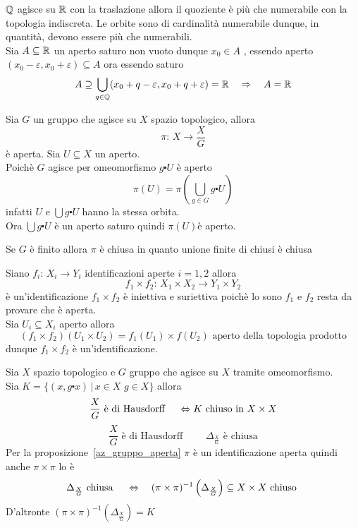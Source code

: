 \spazio
\begin{ese}$\mathbb{Q}$ agisce su $\mathbb{R}$ con la traslazione allora il quoziente \`e pi\`u che numerabile con la topologia indiscreta.
\proof
Le orbite sono di cardinalit\`a numerabile dunque, in quantit\`a, devono essere pi\`u che numerabili.\\
Sia $A\subseteq \mathbb{R}$ un aperto saturo non vuoto dunque $x_0 \in A $ , essendo aperto $(x_0-\varepsilon, x_0 + \varepsilon ) \subseteq A $ ora essendo saturo
$$ A \supseteq \bigcup_{q \in \mathbb{Q}} (x_0+q-\varepsilon, x_0+q +\varepsilon) =\mathbb{R} \quad \Rightarrow \quad A = \mathbb{R}$$
\end{ese}
\spazio
\begin{prop}\label{az_gruppo_aperta}Sia $G$ un gruppo che agisce su $X$ spazio topologico, allora
$$ \pi:\, X \to \frac{X}{G}$$
\`e aperta.
\proof Sia $U \subseteq X$ un aperto.\\
Poich\`e $G$ agisce per omeomorfismo $g\centerdot U $ \`e aperto 
$$ \pi(U) = \pi \left( \bigcup_{g \in G } g\centerdot U \right)$$
infatti $U$ e $\bigcup g \centerdot U$ hanno la stessa orbita.\\
Ora $\bigcup g\centerdot U$ \`e un aperto saturo quindi $\pi(U)$\`e aperto.
\endproof
\end{prop}
\begin{oss}Se $G$ \`e finito allora $\pi$ \`e chiusa in quanto unione finite di chiusi \`e chiusa
\end{oss}
\spazio
\begin{prop}Siano $f_i :\, X_i \to Y_i$ identificazioni aperte $i=1,2$ allora
$$ f_1 \times f_2 :\, X_1 \times X_2 \to Y_1 \times Y_2$$ \`e un'identificazione
\proof $f_1\times f_2$ \`e iniettiva e suriettiva poich\`e lo sono $f_1$ e $f_2$ resta da provare che \`e aperta.\\
Sia $U_i\subseteq X_i$ aperto allora
$$ ( f_1 \times f_2) (U_1 \times U_2 ) = f_1(U_1) \times f(U_2) \text{ aperto della topologia prodotto}$$
dunque $f_1\times f_2$ \`e un'identificazione.
\end{prop}
\spazio
\begin{prop}Sia $X$ spazio topologico e $G$ gruppo che agisce su $X$ tramite omeomorfismo.\\
Sia $K = \{ (x,g\centerdot x) \, \vert \,  x\in X \, \, g \in X \}$ allora
$$ \frac{X}{G} \text{ \`e di Hausdorff } \quad \Leftrightarrow  K \text{ chiuso in } X \times X $$
\proof $$ \frac{X}{G} \text{ \`e di Hausdorff } \quad  \quad \Delta_{\frac{X}{G}} \text{ \`e chiusa}$$
Per la proposizione~\ref{az_gruppo_aperta} $\pi$ \`e un identificazione aperta quindi anche $\pi \times \pi$ lo \`e
$$ \Delta_{\frac{X}{G}} \text{ chiusa } \quad \Leftrightarrow \quad ( \pi \times \pi )^{-1} \left( \Delta_{\frac{X}{G}} \right)\subseteq X \times X \text{ chiuso } $$
D'altronte $ ( \pi \times \pi )^{-1} \left( \Delta_{\frac{X}{G}} \right)=K$
\endproof
\end{prop}
\newpage
